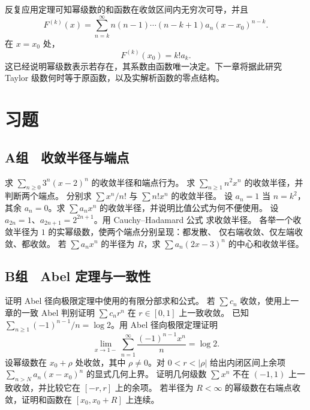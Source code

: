 反复应用定理可知幂级数的和函数在收敛区间内无穷次可导，并且
\[
 F^{(k)}(x)
 =\sum_{n=k}^\infty
 n(n-1)\cdots(n-k+1)a_n(x-x_0)^{n-k}.
\]
在 \(x=x_0\) 处，
\[
 F^{(k)}(x_0)=k!a_k.
\]
这已经说明幂级数表示若存在，其系数由函数唯一决定。下一章将据此研究
Taylor 级数何时等于原函数，以及实解析函数的零点结构。

\section*{习题}

\subsection*{A组　收敛半径与端点}
\begin{enumerate}[label=\textbf{\thechapter.\arabic*.}]
 求 \(\sum_{n\ge0}3^n(x-2)^n\) 的收敛半径和端点行为。
 求 \(\sum_{n\ge1}n^2x^n\) 的收敛半径，并判断两个端点。
 分别求 \(\sum x^n/n!\) 与 \(\sum n!x^n\) 的收敛半径。
 设 \(a_n=1\) 当 \(n=k^2\)，其余 \(a_n=0\)。求
 \(\sum a_nx^n\) 的收敛半径，并说明比值公式为何不便使用。
 设 \(a_{2n}=1\)、\(a_{2n+1}=2^{2n+1}\)。用 Cauchy--Hadamard 公式
 求收敛半径。
 各举一个收敛半径为 \(1\) 的实幂级数，使两个端点分别呈现：都发散、
 仅右端收敛、仅左端收敛、都收敛。
 若 \(\sum a_nx^n\) 的半径为 \(R\)，求
 \(\sum a_n(2x-3)^n\) 的中心和收敛半径。
\end{enumerate}

\subsection*{B组　Abel 定理与一致性}
\begin{enumerate}[label=\textbf{\thechapter.\arabic*.},resume]
 证明 Abel 径向极限定理中使用的有限分部求和公式。
 若 \(\sum c_n\) 收敛，使用上一章的一致 Abel 判别证明
 \(\sum c_nr^n\) 在 \(r\in[0,1]\) 上一致收敛。
 已知 \(\sum_{n\ge1}(-1)^{n-1}/n=\log2\)。用 Abel 径向极限定理证明
 \[
  \lim_{x\to1-}\sum_{n=1}^\infty\frac{(-1)^{n-1}x^n}{n}=\log2.
 \]
 设幂级数在 \(x_0+\rho\) 处收敛，其中 \(\rho\ne0\)。对 \(0<r<|\rho|\) 给出内闭区间上余项
 \(\sum_{n>N}a_n(x-x_0)^n\) 的显式几何上界。
 证明几何级数 \(\sum x^n\) 不在 \((-1,1)\) 上一致收敛，并比较它在
 \([-r,r]\) 上的余项。
 若半径为 \(R<\infty\) 的幂级数在右端点收敛，证明和函数在
 \([x_0,x_0+R]\) 上连续。
\end{enumerate}

